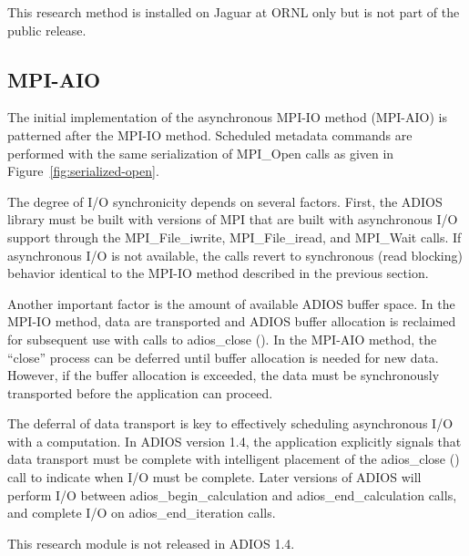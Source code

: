 This research method is installed on Jaguar at ORNL only but is not part of the 
public release.

\subsection{MPI-AIO}

The initial implementation of the asynchronous MPI-IO method (MPI-AIO) is patterned 
after the MPI-IO method. Scheduled metadata commands are performed with the same 
serialization of MPI\_Open calls as given in Figure~\ref{fig:serialized-open}.

The degree of I/O synchronicity depends on several factors. First, the ADIOS library 
must be built with versions of MPI that are built with asynchronous I/O support 
through the MPI\_File\_iwrite, MPI\_File\_iread, and MPI\_Wait calls. If asynchronous 
I/O is not available, the calls revert to synchronous (read blocking) behavior 
identical to the MPI-IO method described in the previous section. 

Another important factor is the amount of available ADIOS buffer space. In the 
MPI-IO method, data are transported and ADIOS buffer allocation is reclaimed for 
subsequent use with calls to adios\_close (). In the MPI-AIO method, the ``close'' 
process can be deferred until buffer allocation is needed for new data. However, 
if the buffer allocation is exceeded, the data must be synchronously transported 
before the application can proceed.

The deferral of data transport is key to effectively scheduling asynchronous I/O 
with a computation. In ADIOS version 1.4, the application explicitly signals that 
data transport must be complete with intelligent placement of the adios\_close 
() call to indicate when I/O must be complete. Later versions of ADIOS will perform 
I/O between adios\_begin\_calculation and adios\_end\_calculation calls, and complete 
I/O on adios\_end\_iteration calls.

This research module is not released in ADIOS 1.4.

